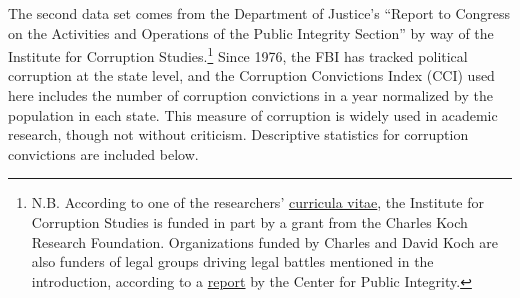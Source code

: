 \documentclass{jopsubmission}
\begin{document}
\begin{table}[!htbp]\centering 
\caption{Descriptive Statistics for State Level Campaign Finance Limits} 
\label{} 
\end{table}
    

The second data set comes from the Department of Justice's ``Report to
Congress on the Activities and Operations of the Public Integrity
Section'' by way of the Institute for Corruption Studies.\footnote{N.B.
  According to one of the researchers'
  \href{https://about.illinoisstate.edu/odincer/Documents/CVDincerApril2016.docx}{curricula
  vitae}, the Institute for Corruption Studies is funded in part by a
  grant from the Charles Koch Research Foundation. Organizations funded
  by Charles and David Koch are also funders of legal groups driving
  legal battles mentioned in the introduction, according to a
  \href{https://www.publicintegrity.org/2017/11/15/21279/kochs-key-among-small-group-quietly-funding-legal-assault-campaign-finance}{report}
  by the Center for Public Integrity.} Since 1976, the FBI has tracked
political corruption at the state level, and the Corruption Convictions
Index (CCI) used here includes the number of corruption convictions in a
year normalized by the population in each state. This measure of
corruption is widely used in academic research, though not without
criticism. Descriptive statistics for corruption convictions are
included below.
\end{document}

